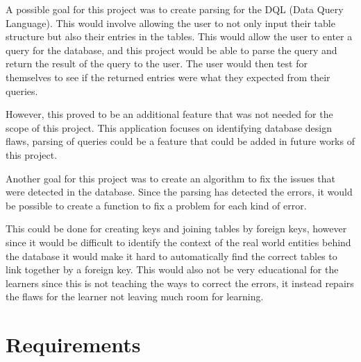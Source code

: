 A possible goal for this project was to create parsing for the DQL (Data Query Language). This would involve allowing the user to not only input their table structure but also their entries in the tables. This would allow the user to enter a query for the database, and this project would be able to parse the query and return the result of the query to the user. The user would then test for themselves to see if the returned entries were what they expected from their queries. 

However, this proved to be an additional feature that was not needed for the scope of this project. This application focuses on identifying database design flaws, parsing of queries could be a feature that could be added in future works of this project.

Another goal for this project was to create an algorithm to fix the issues that were detected in the database. Since the parsing has detected the errors, it would be possible to create a function to fix a problem for each kind of error. 

This could be done for creating keys and joining tables by foreign keys, however since it would be difficult to identify the context of the real world entities behind the database it would make it hard to automatically find the correct tables to link together by a foreign key. This would also not be very educational for the learners since this is not teaching the ways to correct the errors, it instead repairs the flaws for the learner not leaving much room for learning. 

\section{Requirements}

